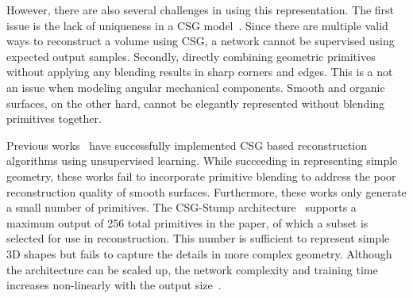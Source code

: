 However, there are also several challenges in using this representation. The first issue is the lack of uniqueness in a CSG model~\cite{Hughes2013}. Since there are multiple valid ways to reconstruct a volume using CSG, a network cannot be supervised using expected output samples. Secondly, directly combining geometric primitives without applying any blending results in sharp corners and edges. This is a not an issue when modeling angular mechanical components. Smooth and organic surfaces, on the other hard, cannot be elegantly represented without blending primitives together.

Previous works~\cite{Sharma2018, Kania2020, Ren2021} have successfully implemented CSG based reconstruction algorithms using unsupervised learning. While succeeding in representing simple geometry, these works fail to incorporate primitive blending to address the poor reconstruction quality of smooth surfaces. Furthermore, these works only generate a small number of primitives. The CSG-Stump architecture~\cite{Ren2021} supports a maximum output of 256 total primitives in the paper, of which a subset is selected for use in reconstruction. This number is sufficient to represent simple 3D shapes but fails to capture the details in more complex geometry. Although the architecture can be scaled up, the network complexity and training time increases non-linearly with the output size~\cite{Ren2021}.

